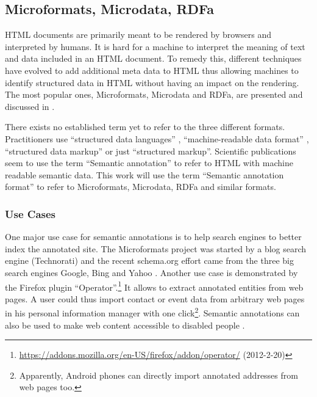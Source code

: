 \documentclass[11pt,a4paper,headsepline,twoside]{scrartcl}		%
\newcommand{\citeurl}[2]{\url{#1} (#2)}
\begin{document}
\subsection{Microformats, Microdata, RDFa}
\label{sec:microdata}

HTML documents are primarily meant to be rendered by browsers and interpreted by
humans. It is hard for a machine to interpret the meaning of text and data
included in an HTML document. To remedy this, different techniques have evolved to
add additional meta data to HTML thus allowing machines to identify structured
data in HTML without having an impact on the rendering. The most popular ones,
Microformats, Microdata and RDFa, are presented and discussed in
\cite{Tennison2012}.

There exists no established term yet to refer to the three different
formats. Practitioners use ``structured data languages'' \cite{Sporny2011},
``machine-readable data format'' \cite{Hickson2011}, ``structured data
markup'' \cite{Goel2011} or just ``structured markup''. Scientific publications
seem to use the term ``Semantic annotation'' \cite{instance7} to refer to HTML
with machine readable semantic data. This work will use the term ``Semantic
annotation format'' to refer to Microformats, Microdata, RDFa and similar
formats.

\subsubsection{Use Cases}
\label{sec:semantic-anno-use-cases}

One major use case for semantic annotations is to help search engines to better
index the annotated site. The Microformats project was started by a blog search
engine (Technorati) \cite{Celik2006} and the recent schema.org effort came from
the three big search engines Google, Bing and Yahoo \cite{Goel2011}. Another use
case is demonstrated by the Firefox plugin
``Operator''.\footnote{\citeurl{https://addons.mozilla.org/en-US/firefox/addon/operator/}{2012-2-20}}
It allows to extract annotated entities from web pages. A user could thus import
contact or event data from arbitrary web pages in his personal information
manager with one click\footnote{Apparently, Android phones can directly import
  annotated addresses from web pages too.}. Semantic annotations can also be
used to make web content accessible to disabled
people \cite{Yesilada:2007:EDS:1279700.1279704}.
\end{document}
